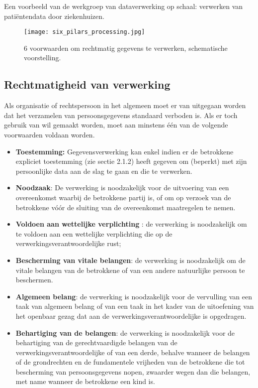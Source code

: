 Een voorbeeld van de werkgroep van dataverwerking op schaal: verwerken van patiëntendata door ziekenhuizen.  

\begin{figure}[h]
	\centering
	\texttt{[image: six\_pilars\_processing.jpg]}
	\caption{6 voorwaarden om rechtmatig gegevens te verwerken, schematische voorstelling. \textcite{IScoop2017}}
\end{figure}


\subsection{Rechtmatigheid van verwerking}
Als organisatie of rechtspersoon in het algemeen moet er van uitgegaan worden dat het verzamelen van persoonsgegevens standaard verboden is. Als er toch gebruik van wil gemaakt worden, moet aan minstens één van de volgende voorwaarden voldaan worden. \textcite{Commissie2016}
\begin{itemize}
    \item \textbf{Toestemming:} Gegevensverwerking kan enkel indien er de betrokkene expliciet toestemming (zie sectie 2.1.2) heeft gegeven om (beperkt) met zijn persoonlijke data aan de slag te gaan en die te verwerken. \\
    
    \item \textbf{Noodzaak}: De verwerking is noodzakelijk voor de uitvoering van een overeenkomst waarbij de betrokkene partij is, of om op verzoek van de betrokkene vóór de sluiting van de overeenkomst maatregelen te nemen. \\
    
    \item \textbf{Voldoen aan wettelijke verplichting }: de verwerking is noodzakelijk om te voldoen aan een wettelijke verplichting die op de verwerkingsverantwoordelijke rust; \\
    
     \item \textbf{Bescherming van vitale belangen}:  de verwerking is noodzakelijk om de vitale belangen van de betrokkene of van een andere natuurlijke persoon te beschermen. \\
    
    \item \textbf{Algemeen belang}: de verwerking is noodzakelijk voor de vervulling van een taak van algemeen belang of van een taak in het kader van de uitoefening van het openbaar gezag dat aan de verwerkingsverantwoordelijke is opgedragen. \\
    
     \item \textbf{Behartiging van de belangen}: de verwerking is noodzakelijk voor de behartiging van de gerechtvaardigde belangen van de verwerkingsverantwoordelijke of van een derde, behalve wanneer de belangen of de grondrechten en de fundamentele vrijheden van de betrokkene die tot bescherming van persoonsgegevens nopen, zwaarder wegen dan die belangen, met name wanneer de betrokkene een kind is. \\
\end{itemize}



